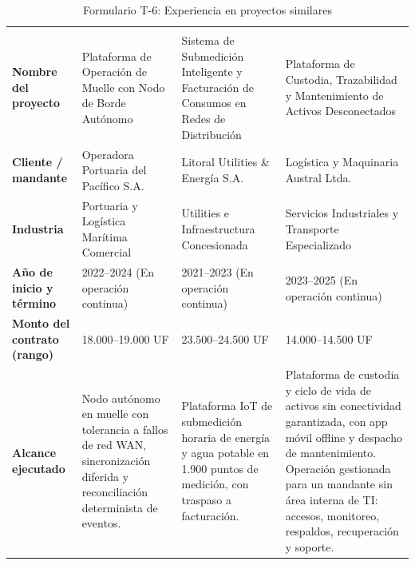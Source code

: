 \documentclass[11pt,letterpaper]{report}
\begin{document}
\begin{longtable}{L{\dimexpr.19\tabcolsep\relax}L{\dimexpr.27\tabcolsep\relax}L{\dimexpr.27\tabcolsep\relax}L{\dimexpr.27\tabcolsep\relax}}
    \caption{Formulario T-6: Experiencia en proyectos similares}
    \label{tab:experiencia-proyectos-similares} \\
    \hline
     &
     &
     &
     \\
    \hline
    \endfirsthead
    \hline
     &
     &
     &
     \\
    \hline
    \endhead
    \textbf{Nombre del proyecto} &
    Plataforma de Operación de Muelle con Nodo de Borde Autónomo &
    Sistema de Submedición Inteligente y Facturación de Consumos
    en Redes de Distribución &
    Plataforma de Custodia, Trazabilidad y Mantenimiento de
    Activos Desconectados \\
    \hline
    \textbf{Cliente / mandante} &
    Operadora Portuaria del Pacífico S.A. &
    Litoral Utilities \& Energía S.A. &
    Logística y Maquinaria Austral Ltda. \\
    \hline
    \textbf{Industria} &
    Portuaria y Logística Marítima Comercial &
    Utilities e Infraestructura Concesionada &
    Servicios Industriales y Transporte Especializado \\
    \hline
    \textbf{Año de inicio y término} &
    2022--2024 (En operación continua) &
    2021--2023 (En operación continua) &
    2023--2025 (En operación continua) \\
    \hline
    \textbf{Monto del contrato (rango)} &
    18.000--19.000 UF &
    23.500--24.500 UF &
    14.000--14.500 UF \\
    \hline
    \textbf{Alcance ejecutado} &
    Nodo autónomo en muelle con tolerancia a fallos de red WAN,
    sincronización diferida y reconciliación determinista de eventos. &
    Plataforma IoT de submedición horaria de energía y agua potable
    en 1.900 puntos de medición, con traspaso a facturación. &
    Plataforma de custodia y ciclo de vida de activos sin conectividad
    garantizada, con app móvil offline y despacho de mantenimiento.
    Operación gestionada para un mandante sin área interna de TI:
    accesos, monitoreo, respaldos, recuperación y soporte.

\end{longtable}
\end{document}

